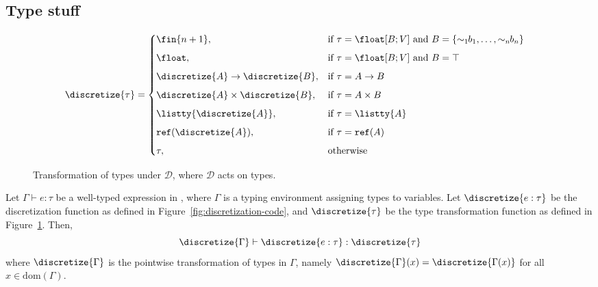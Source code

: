 \subsection{Type stuff}
%
\begin{figure}[t]
	\centering
	\begin{align*}
		\discretize{\tau} &= 
		\begin{cases}
			\fin{n+1}, & \text{if } \tau = \float[B; V] \text{ and } B = \{\sim_1\!\!b_1, \ldots, \sim_n\!\!b_n\} \\[0.5em]
			\float, & \text{if } \tau = \float[B; V] \text{ and } B = \top \\[0.5em]
			\discretize{A} \to \discretize{B}, & \text{if } \tau = A \to B \\[0.5em]
			\discretize{A} \times \discretize{B}, & \text{if } \tau = A \times B \\[0.5em]
			\listty{\discretize{A}}, & \text{if } \tau = \listty{A} \\[0.5em]
			\texttt{ref}(\discretize{A}), & \text{if } \tau = \texttt{ref}(A) \\[0.5em]
			\tau, & \text{otherwise}
		\end{cases}
	\end{align*}
	\caption{Transformation of types under $\mathcal{D}$, where $\mathcal{D}$ acts on types.}
	\label{fig:discretization-types}
\end{figure}
%
%
\begin{lemma}\label{lem:type-transformations}
	Let $\Gamma \vdash e : \tau$ be a well-typed expression in \Slice{}, where $\Gamma$ is a typing environment assigning types to variables. Let $\discretize{e : \tau}$ be the discretization function as defined in Figure~\ref{fig:discretization-code}, and $\discretize{\tau}$ be the type transformation function as defined in Figure~\ref{fig:discretization-types}. Then,
	\[
	\discretize{\Gamma} \vdash \discretize{e : \tau} : \discretize{\tau}
	\]
	where $\discretize{\Gamma}$ is the pointwise transformation of types in $\Gamma$, namely $\discretize{\Gamma}(x) = \discretize{\Gamma(x)}$ for all $x \in \text{dom}(\Gamma)$.
\end{lemma}
